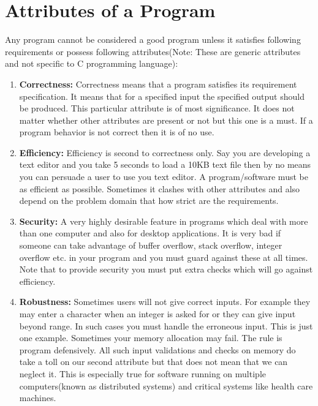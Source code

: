 \section{Attributes of a Program}
Any program cannot be considered a good program unless it satisfies following
requirements or possess following attributes(Note: These are generic
attributes and not specific to C programming language):
\begin{enumerate}
  \item \textbf{Correctness:} Correctness means that a program satisfies its
    requirement specification. It means that for a specified input the
    specified output should be produced. This particular attribute is of most
    significance. It does not matter whether other attributes are present or
    not but this one is a must. If a program behavior is not correct then it is
    of no use.

  \item \textbf{Efficiency:} Efficiency is second to correctness only. Say you
    are developing a text editor and you take 5 seconds to load a 10KB text
    file then by no means you can persuade a user to use you text editor. A
    program/software must be as efficient as possible. Sometimes it clashes
    with other attributes and also depend on the problem domain that how strict
    are the requirements.

  \item \textbf{Security:} A very highly desirable feature in programs which
    deal with more than one computer and also for desktop applications. It is
    very bad if someone can take advantage of buffer overflow, stack overflow,
    integer overflow etc. in your program and you must guard against these at
    all times. Note that to provide security you must put extra checks which
    will go against efficiency.

\item \textbf{Robustness:} Sometimes users will not give correct inputs. For
  example they may enter a character when an integer is asked for or they can
  give input beyond range. In such cases you must handle the erroneous
  input. This is just one example. Sometimes your memory allocation may
  fail. The rule is program defensively. All such input validations and checks
  on memory do take a toll on our second attribute but that does not mean that
  we can neglect it. This is especially true for software running on multiple
  computers(known as distributed systems) and critical systems like health care
  machines.


\end{enumerate}
